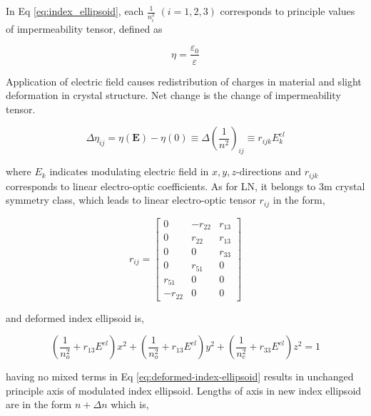 \documentclass[thesis]{deutez}
\begin{document}
    In Eq \ref{eq:index_ellipsoid}, each $\frac{1}{n^2_{i}}$ $(i=1,2,3)$ corresponds to principle values of impermeability tensor, defined as

    \begin{equation}
        \eta = \frac{\varepsilon_0}{\varepsilon}
        \label{eq:impermeability}
    \end{equation}

    Application of electric field causes redistribution of charges in material and slight deformation in crystal structure. Net change is the change of impermeability tensor. 

    \begin{equation}
        \Delta\eta _ {ij} = \eta(\mathbf{E})-\eta(0) \equiv \Delta \left( \frac{1}{n^2} \right)_{ij} \equiv r_{ijk}E_k^{el}
        \label{eq:elect-opt-mod-imperm}
    \end{equation}

    where $E_k$ indicates modulating electric field in $x,y,z$-directions and $r_{ijk}$ corresponds to linear electro-optic coefficients. As for LN, it belongs to 3m crystal symmetry class, which leads to linear electro-optic tensor $r_{ij}$ in the form,

    \begin{equation}
        r_{ij}=
        \begin{bmatrix}
            0 & -r_{22} & r_{13}\\
            0 & r_{22} & r_{13} \\
            0 & 0 & r_{33}\\
            0 & r_{51} & 0\\
            r_{51} & 0 & 0\\
            -r_{22} & 0 & 0 
            
        \end{bmatrix}
        \label{eq:3m-linear-el-opt-tensor}
    \end{equation}

    and deformed index ellipsoid is,

    \begin{equation}
        \left(\frac{1}{n_o^2} + r_{13}E^{el}\right)x^2+\left(\frac{1}{n_o^2} + r_{13}E^{el}\right)y^2+\left(\frac{1}{n_e^2} + r_{33}E^{el}\right)z^2 = 1
        \label{eq:deformed-index-ellipsoid}
    \end{equation}
    
    having no mixed terms in Eq \ref{eq:deformed-index-ellipsoid} results in unchanged principle axis of modulated index ellipsoid. Lengths of axis in new index ellipsoid are in the form $n+\Delta n$ which is,
\end{document}
